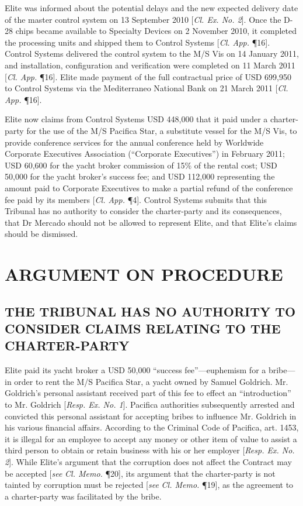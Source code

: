 Elite was informed about the potential delays and the new expected delivery date of the master control system on 13 September 2010 [\textit{Cl. Ex. No. 2}]. Once the D-28 chips became available to Specialty Devices on 2 November 2010, it completed the processing units and shipped them to Control Systems [\textit{Cl. App.} \P 16]. Control Systems delivered the control system to the M/S Vis on 14 January 2011, and installation, configuration and verification were completed on 11 March 2011 [\textit{Cl. App.} \P 16]. Elite made payment of the full contractual price of USD 699,950 to Control Systems via the Mediterraneo National Bank on 21 March 2011 [\textit{Cl. App.} \P 16].

Elite now claims from Control Systems USD 448,000 that it paid under a charter-party for the use of the M/S Pacifica Star, a substitute vessel for the M/S Vis, to provide conference services for the annual conference held by Worldwide Corporate Executives Association (``Corporate Executives'') in February 2011; USD 60,600 for the yacht broker commission of 15\% of the rental cost; USD 50,000 for the yacht broker's success fee; and USD 112,000  representing the amount paid to Corporate Executives to make a partial refund of the conference fee paid by its members [\textit{Cl. App.} \P 4]. Control Systems submits that this Tribunal has no authority to consider the charter-party and its consequences, that Dr Mercado should not be allowed to represent Elite, and that Elite's claims should be dismissed.

\clearpage
\section{ARGUMENT ON PROCEDURE}

\subsection{THE TRIBUNAL HAS NO AUTHORITY TO CONSIDER CLAIMS RELATING TO THE CHARTER-PARTY}

Elite paid its yacht broker a USD 50,000 ``success fee''---euphemism for a bribe---in order to rent the M/S Pacifica Star, a yacht owned by Samuel Goldrich. Mr. Goldrich's personal assistant received part of this fee to effect an ``introduction'' to Mr. Goldrich [\textit{Resp. Ex. No. 1}]. Pacifica authorities subsequently arrested and convicted this personal assistant for accepting bribes to influence Mr. Goldrich in his various financial affairs. According to the Criminal Code of Pacifica, art. 1453, it is illegal for an employee to accept any money or other item of value to assist a third person to obtain or retain business with his or her employer [\textit{Resp. Ex. No. 2}]. While Elite's argument that the corruption does not affect the Contract may be accepted [\textit{see} \textit{Cl. Memo.} \P 20], its argument that the charter-party is not tainted by corruption must be rejected [\textit{see} \textit{Cl. Memo.} \P 19], as the agreement to a charter-party was facilitated by the bribe.


